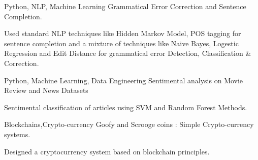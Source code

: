 \begin{cventries}
    
    \cventry
    {Python, NLP, Machine Learning} %
    {Grammatical Error Correction and Sentence Completion.} %
    {} %
    {} %
    {
      \begin{cvitems} %
        \item {Used standard NLP techniques like Hidden Markov Model, POS tagging for sentence completion and a mixture of techniques like Naive Bayes, Logestic Regression and Edit Distance for grammatical error Detection, Classification \& Correction.}
      \end{cvitems}
    }
    
    
    
    \cventry
    {Python, Machine Learning, Data Engineering} %
    {Sentimental analysis on Movie Review and News Datasets} %
    {} %
    {} %
    {
      \begin{cvitems} %
        \item {Sentimental classification of articles using SVM and Random Forest Methods.}
      \end{cvitems}
    }
    
        \cventry
    {Blockchains,Crypto-currency} %
    {Goofy and Scrooge coins : Simple Crypto-currency systems.} %
    {} %
    {} %
    {
      \begin{cvitems} %
        \item {Designed a cryptocurrency system based on blockchain principles.}
      \end{cvitems}
    }
\newpage
\end{cventries}